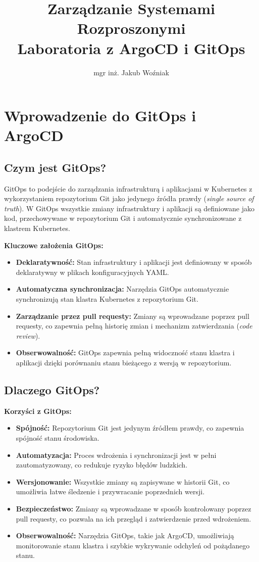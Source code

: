 \documentclass{article}
\title{Zarządzanie Systemami Rozproszonymi\\Laboratoria z ArgoCD i GitOps}
\author{mgr inż. Jakub Woźniak}
\date{}
\begin{document}
\maketitle


\section{Wprowadzenie do GitOps i ArgoCD}

\subsection{Czym jest GitOps?}

GitOps to podejście do zarządzania infrastrukturą i aplikacjami w Kubernetes z wykorzystaniem repozytorium Git jako jedynego źródła prawdy (\textit{single source of truth}). W GitOps wszystkie zmiany infrastruktury i aplikacji są definiowane jako kod, przechowywane w repozytorium Git i automatycznie synchronizowane z klastrem Kubernetes.

\textbf{Kluczowe założenia GitOps:}
\begin{itemize}
    \item \textbf{Deklaratywność:} Stan infrastruktury i aplikacji jest definiowany w sposób deklaratywny w plikach konfiguracyjnych YAML.
    \item \textbf{Automatyczna synchronizacja:} Narzędzia GitOps automatycznie synchronizują stan klastra Kubernetes z repozytorium Git.
    \item \textbf{Zarządzanie przez pull requesty:} Zmiany są wprowadzane poprzez pull requesty, co zapewnia pełną historię zmian i mechanizm zatwierdzania (\textit{code review}).
    \item \textbf{Obserwowalność:} GitOps zapewnia pełną widoczność stanu klastra i aplikacji dzięki porównaniu stanu bieżącego z wersją w repozytorium.
\end{itemize}

\subsection{Dlaczego GitOps?}

\textbf{Korzyści z GitOps:}
\begin{itemize}
    \item \textbf{Spójność:} Repozytorium Git jest jedynym źródłem prawdy, co zapewnia spójność stanu środowiska.
    \item \textbf{Automatyzacja:} Proces wdrożenia i synchronizacji jest w pełni zautomatyzowany, co redukuje ryzyko błędów ludzkich.
    \item \textbf{Wersjonowanie:} Wszystkie zmiany są zapisywane w historii Git, co umożliwia łatwe śledzenie i przywracanie poprzednich wersji.
    \item \textbf{Bezpieczeństwo:} Zmiany są wprowadzane w sposób kontrolowany poprzez pull requesty, co pozwala na ich przegląd i zatwierdzenie przed wdrożeniem.
    \item \textbf{Obserwowalność:} Narzędzia GitOps, takie jak ArgoCD, umożliwiają monitorowanie stanu klastra i szybkie wykrywanie odchyleń od pożądanego stanu.
\end{itemize}
\end{document}
